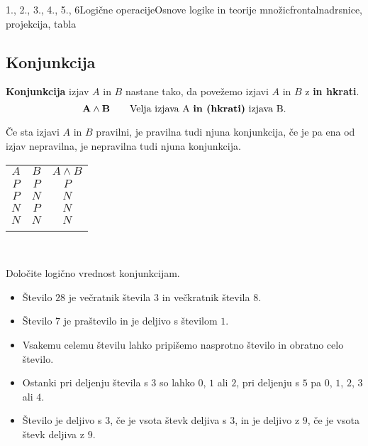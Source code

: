 \begin{priprava}{1., 2., 3., 4., 5., 6}{}{Logične operacije}{Osnove logike in teorije množic}{frontalna}{drsnice, projekcija, tabla}
~

   \subsection{Konjunkcija}
      \textbf{Konjunkcija} izjav $A$ in $B$ nastane tako, da povežemo izjavi $A$ in $B$ 
      z \textbf{in hkrati}.
      $$ \mathbf{A\land B} \quad \quad \textmd{Velja izjava A \textbf{in (hkrati)} izjava B.}$$
   
              Če sta izjavi $A$ in $B$ pravilni, je pravilna tudi njuna konjunkcija, 
              če je pa ena od izjav nepravilna, je nepravilna tudi njuna konjunkcija.
           

          \begin{table}[H]
              \centering
              \begin{tabular}{||c|c|c||} 
              \hhline{|t:===:t|}
              \rowcolor[rgb]{0.843,0.718,0.718} $A$ & $B$ & $A\land B$  \\ 
              \hhline{|:===:|}
              $P$ & $P$ & $P$                         \\ 
              \hline
              $P$ & $N$ & $N$                         \\ 
              \hline
              $N$ & $P$ & $N$                         \\ 
              \hline
              $N$ & $N$ & $N$                         \\
              \hhline{|b:===:b|}
              \end{tabular}
          \end{table}


~



   \begin{naloga}
      Določite logično vrednost konjunkcijam.
      \begin{itemize}
          \item Število $28$ je večratnik števila $3$ in večkratnik števila $8$.
          \item Število $7$ je praštevilo in je deljivo s številom $1$.
          \item Vsakemu celemu številu lahko pripišemo nasprotno število in obratno celo število.
          \item Ostanki pri deljenju števila s $3$ so lahko $0$, $1$ ali $2$, 
              pri deljenju s $5$ pa $0$, $1$, $2$, $3$ ali $4$.
          \item Število je deljivo s $3$, če je vsota števk deljiva s $3$, in je 
              deljivo z $9$, če je vsota števk deljiva z $9$.
      \end{itemize}
  \end{naloga}


\end{priprava}
